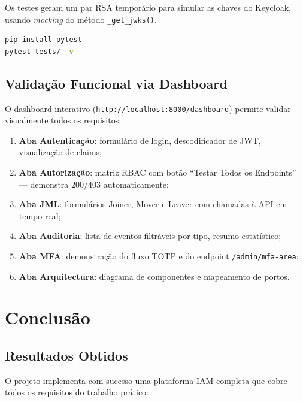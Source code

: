 \documentclass[12pt,a4paper]{article}
\begin{document}
Os testes geram um par RSA temporário para simular as chaves do Keycloak, usando \textit{mocking} do método \texttt{\_get\_jwks()}.

\begin{lstlisting}[language=bash, caption=Execução dos testes unitários]
pip install pytest
pytest tests/ -v
\end{lstlisting}

\subsection{Validação Funcional via Dashboard}

O dashboard interativo (\texttt{http://localhost:8000/dashboard}) permite validar visualmente todos os requisitos:

\begin{enumerate}[leftmargin=1.5cm]
  \item \textbf{Aba Autenticação}: formulário de login, descodificador de JWT, visualização de claims;
  \item \textbf{Aba Autorização}: matriz RBAC com botão ``Testar Todos os Endpoints'' — demonstra 200/403 automaticamente;
  \item \textbf{Aba JML}: formulários Joiner, Mover e Leaver com chamadas à API em tempo real;
  \item \textbf{Aba Auditoria}: lista de eventos filtráveis por tipo, resumo estatístico;
  \item \textbf{Aba MFA}: demonstração do fluxo TOTP e do endpoint \texttt{/admin/mfa-area};
  \item \textbf{Aba Arquitectura}: diagrama de componentes e mapeamento de portos.
\end{enumerate}

\section{Conclusão}

\subsection{Resultados Obtidos}

O projeto implementa com sucesso uma plataforma IAM completa que cobre todos os requisitos do trabalho prático:
\end{document}
